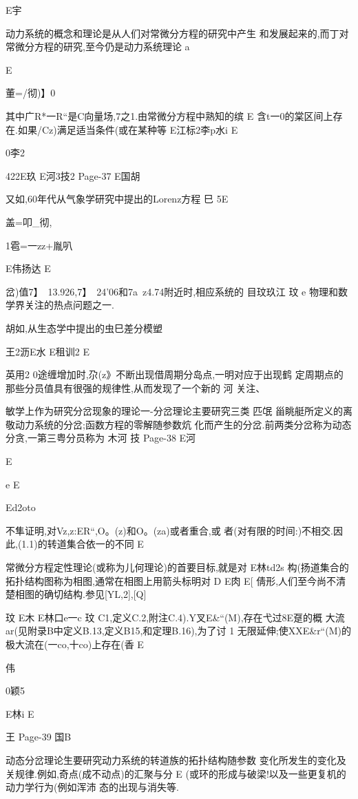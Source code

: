 E宇

动力系统的概念和理论是从人们对常微分方程的研究中产生
和发展起来的,而丁对常微分方程的研究,至今仍是动力系统理论
a

E

董=/彻)】0

其中广R*一R“是C向量场,7之1.由常微分方程中熟知的缤
E
含t一0的棠区间上存在.如果/Cz)满足适当条件(或在某种等
E江标2李p水i
E

0李2

422E玖
E河3技2
Page-37
E国胡

又如,60年代从气象学研究中提出的Lorenz方程
巳
5E

盖=叩_彻,

1雹=一zz+胤叭

E伟扬达
E

岔)值7】~13.926,7】~24'06和7a~z4.74附近时,相应系统的
目玟玖江
玟
e
物理和数学界关注的热点问题之一.

胡如,从生态学中提出的虫巳差分模塑

王2沥E水
E租训2
E

英用2
0途缠增加时,尕(z》不断出现借周期分岛点,一明对应于出现鹤
定周期点的那些分员值具有很强的规律性,从而发现了一个新的
河
关注、

敏学上作为研究分岔现象的理论一-分岔理论主要研究三类
匹氓
甾眺艇所定义的离敬动力系统的分岔;函数方程的零解随参数炕
化而产生的分岔.前两类分岔称为动态分贪,一第三粤分员称为
木河
技
Page-38
E河

E

e
E

Ed2oto

不隼证明,对Vz,z:ER“,O。(z)和O。(za)或者重合,或
者(对有限的时间:)不相交.因此,(1.1)的转道集合依一的不同
E

常微分方程定性理论(或称为儿何理论)的首要目标,就是对
E林td2s
构(扬道集合的拓扑结构图称为相图,通常在相图上用箭头标明对
D
E肉
E[
倩形,人们至今尚不清楚相图的确切结构.参见[YL,2],[Q]

玟
E木
E林口e一c
玟
C1,定义C.2,附注C.4).Y叉E&“(M),存在弋过8E趸的概
大流ar(见附录B中定义B.13,定义B15,和定理B.16),为了讨
1
无限延伸;使XXE&r“(M)的极大流在(一co,十co)上存在(香
E

伟

0颖5

E林i
E

王
Page-39
国B

动态分岔理论生要研究动力系统的转道族的拓扑结构随参数
变化所发生的变化及关规律.例如,奇点(成不动点)的汇聚与分
E
(或环的形成与破梁!以及一些更复机的动力学行为(例如浑沛
态的出现与消失等.

